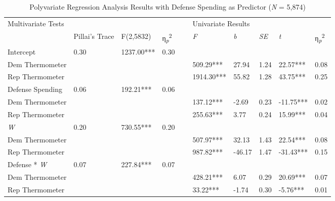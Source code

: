 \documentclass[authordate, meta]{jote-new-article}
\begin{document}
	\begin{table}[H]
		\begin{fullwidth}
		\caption{Polyvariate Regression Analysis Results with Defense Spending as Predictor (\emph{N} = 5,874)}
		\begin{tabularx}{\linewidth}{@{} l l l l l l l l l l @{}}
			\hline \multicolumn{4}{l}{Multivariate Tests} &   & \multicolumn{5}{l}{Univariate Results}
			\\

			  & Pillai's Trace & F(2,5832) & η\textsubscript{\emph{p}}\textsuperscript{2} &  &
			\emph{F} & \emph{b} & \emph{SE} & \emph{t} & η\textsubscript{\emph{p}}\textsuperscript{2} \\

			 Intercept & 0.30 & 1237.00*** & 0.30 &  &  &  &  &  &  \\

			 Dem Thermometer &  &  &  &  & 509.29*** & 27.94 & 1.24 & 22.57*** & 0.08 \\

			 Rep Thermometer &  &  &  &  & 1914.30*** & 55.82 & 1.28 & 43.75*** & 0.25
			\\

			 Defense Spending & 0.06 & 192.21*** & 0.06 &  &  &  &  &  &  \\

			 Dem Thermometer &  &  &  &  & 137.12*** & -2.69 & 0.23 & -11.75*** & 0.02
			\\

			 Rep Thermometer &  &  &  &  & 255.63*** & 3.77 & 0.24 & 15.99*** & 0.04 \\

			 \emph{W} & 0.20 & 730.55*** & 0.20 &  &  &  &  &  &  \\

			 Dem Thermometer &  &  &  &  & 507.97*** & 32.13 & 1.43 & 22.54*** & 0.08 \\

			 Rep Thermometer &  &  &  &  & 987.82*** & -46.17 & 1.47 & -31.43*** & 0.15
			\\

			 Defense * \emph{W} & 0.07 & 227.84*** & 0.07 &  &  &  &  &  &  \\

			 Dem Thermometer &  &  &  &  & 428.21*** & 6.07 & 0.29 & 20.69*** & 0.07
			\\

			 Rep Thermometer &  &  &  &  & 33.22*** & -1.74 & 0.30 & -5.76*** & 0.01
			\\


\end{tabularx}
\end{fullwidth}
\end{table}
\end{document}
